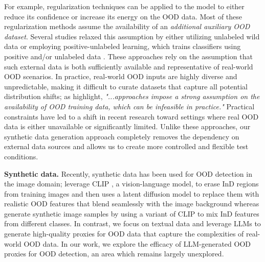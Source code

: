 For example, regularization techniques can be applied to the model to either reduce its confidence \citep{lee2017training, hendrycks2018deep} or increase its energy \citep{NEURIPS2020_f5496252, du2022towards, pmlr-v162-ming22a} on the OOD data.
Most of these regularization methods assume the availability of an \emph{additional auxiliary OOD dataset}. 
Several studies \citep{NEURIPS2021_f4334c13, pmlr-v162-katz-samuels22a, he2023topological} relaxed this assumption by either utilizing unlabeled wild data or employing positive-unlabeled learning, which trains classifiers using positive and/or unlabeled data \citep{letouzey2000learning, pmlr-v37-hsiehb15, niu2016theoretical, gong2018margin, NEURIPS2020_1e6e25d9, NEURIPS2021_47b4f1bf, xu2021positive, NEURIPS2022_8d5f526a, du2024how}. 
These approaches rely on the assumption that such external data is both sufficiently available and representative of real-world OOD scenarios. In practice, real-world OOD inputs are highly diverse and unpredictable, making it difficult to curate datasets that capture all potential distribution shifts; as \citet{yang2024generalized} highlight, \emph{"...approaches impose a strong assumption on the availability of OOD training data, which can be infeasible in practice."} Practical constraints have led to a shift in recent research toward settings where real OOD data is either unavailable or significantly limited. Unlike these approaches, our synthetic data generation approach completely removes the dependency on external data sources and allows us to create more controlled and flexible test conditions. 


\textbf{Synthetic data.}
Recently, synthetic data has been used for OOD detection in the image domain;  \citet{kwon2023improving} leverage CLIP \citep{radford2021learning}, a vision-language model, to erase InD regions from training images and then uses a latent diffusion model to replace them with realistic OOD features that blend seamlessly with the image background whereas \citet{sun2024clip} generate synthetic image samples by using a variant of CLIP to mix InD features from different classes.
In contrast, we focus on textual data and leverage LLMs to generate high-quality proxies for OOD data that capture the complexities of real-world OOD data. In our work, we explore the efficacy of LLM-generated OOD proxies for OOD detection, an area which remains largely unexplored.
\vspace{-0.2cm}